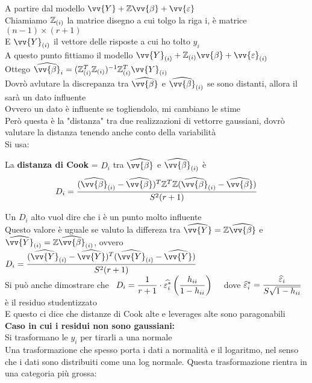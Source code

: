A partire dal modello $\vv{Y}+\ZZ\vv{\beta}+\vv{\eps}$\\
Chiamiamo $\mathbb Z_{(i)}$ la matrice disegno a cui tolgo la riga i, è matrice $(n-1)\times(r+1)$\\
E $\vv{Y}_{(i)}$ il vettore delle risposte a cui ho tolto $y_i$\\
A questo punto fittiamo il modello $\vv{Y}_{(i)}+\ZZ_{(i)}\vv{\beta}+\vv{\eps}_{(i)}$\\
Ottego $\hat{\vv{\beta}}_{i}=(\ZZ_{(i)}^T\ZZ_{(i)})^{-1}\ZZ^T_{(i)}\vv{Y}_{(i)}$\\
Dovrò avlutare la discrepanza tra $\hat{\vv{\beta}}$ e $\hat{\vv{\beta}}_{(i)}$ se sono distanti, allora il sarà un dato influente\\
Ovvero un dato è influente se togliendolo, mi cambiano le stime\\
Però questa è la "distanza" tra due realizzazioni di vettorre gaussiani, dovrò valutare la distanza tenendo anche conto della variabilità\\

Si usa:
\begin{defi}
    La \textbf{distanza di Cook} = $D_i$ tra $\hat{\vv{\beta}}$ e $\hat{\vv{\beta}}_{(i)}$ è
    \[
    D_i=\frac{(\hat{\vv{\beta}}_{(i)}-\hat{\vv{\beta}})^T\ZZ^T\ZZ(\hat{\vv{\beta}}_{(i)}-\hat{\vv{\beta}})}{S^2(r+1)}
    \]
\end{defi}

Un $D_i$ alto vuol dire che i è un punto molto influente\\

Questo valore è uguale se valuto la differeza tra $\hat{\vv{Y}}=\ZZ\hat{\vv{\beta}}$ e $\hat{\vv{Y}}_{(i)}=\ZZ\hat{\vv{\beta}}_{(i)}$, ovvero $D_i=\frac{(\hat{\vv{Y}}_{(i)}-\hat{\vv{Y}})^T(\hat{\vv{Y}}_{(i)}-\hat{\vv{Y}})}{S^2(r+1)}$\\

Si può anche dimostrare che \ $D_i=\dfrac{1}{r+1}\cdot\widehat{\varepsilon_i^*}\left(\dfrac{h_{ii}}{1-h_{ii}}\right)$ \ \ dove $\widehat{\varepsilon}^*_i=\dfrac{\widehat{\varepsilon}_i}{S\sqrt{1-h_{ii}}}$ è il residuo studentizzato\\
E questo ci dice che distanze di Cook alte e leverages alte sono paragonabili\\


\textbf{Caso in cui i residui non sono gaussiani:}\\

Si trasformano le $y_i$ per tirarli a una normale\\

Una trasformazione che spesso porta i dati a normalità e il logaritmo, nel senso che i dati sono distribuiti come una log normale. Questa trasformazione rientra in una categoria più grossa:\\


